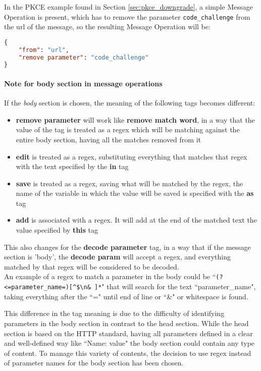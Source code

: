 In the \gls{PKCE} example found in Section \ref{sec:pkce_downgrade}, a simple Message Operation is present, which has to remove the parameter \texttt{code\_challenge} from the url of the message, so the resulting Message Operation will be:
\begin{lstlisting}[language=json, caption=Message Operation definition]
{
    "from": "url",
    "remove parameter": "code_challenge"
}
\end{lstlisting}

\paragraph{Note for body section in message operations}
If the \textit{body} section is chosen, the meaning of the following tags becomes different:
\begin{itemize}
    \item \textbf{remove parameter} will work like \textbf{remove match word}, in a way that the value of the tag is treated as a regex which will be matching against the entire body section, having all the matches removed from it
    \item \textbf{edit} is treated as a regex, substituting everything that matches that regex with the text specified by the \textbf{in} tag
    \item \textbf{save} is treated as a regex, saving what will be matched by the regex, the name of the variable in which the value will be saved is specified with the \textbf{as} tag
    \item \textbf{add} is associated with a regex. It will add at the end of the matched text the value specified by \textbf{this} tag
\end{itemize}

This also changes for the \textbf{decode parameter} tag, in a way that if the message section is 'body', the \textbf{decode param} will accept a regex, and everything matched by that regex will be considered to be decoded. \\ An example of a regex to match a parameter in the body could be ``\verb|(?<=parameter_name=)[^$\n& ]*|" that will search for the text ``parameter\_name", taking everything after the ``=" until end of line or ``\&" or whitespace is found.

This difference in the tag meaning is due to the difficulty of identifying parameters in the body section in contrast to the head section. While the head section is based on the HTTP standard, having all parameters defined in a clear and well-defined way like ``Name: value" the body section could contain any type of content. To manage this variety of contents, the decision to use regex instead of parameter names for the body section has been chosen.

